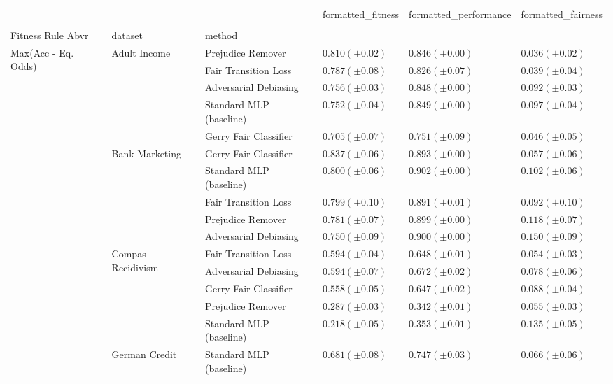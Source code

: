 \begin{tabular}{llllll}
\toprule
 &  &  & formatted_fitness & formatted_performance & formatted_fairness \\
 &  &  &  &  &  \\
Fitness Rule Abvr & dataset & method &  &  &  \\
\midrule
\multirow[t]{20}{*}{Max(Acc - Eq. Odds)} & \multirow[t]{5}{*}{Adult Income} & Prejudice Remover & $0.810 (\pm0.02)$ & $0.846 (\pm0.00)$ & $0.036 (\pm0.02)$ \\
 &  & Fair Transition Loss & $0.787 (\pm0.08)$ & $0.826 (\pm0.07)$ & $0.039 (\pm0.04)$ \\
 &  & Adversarial Debiasing & $0.756 (\pm0.03)$ & $0.848 (\pm0.00)$ & $0.092 (\pm0.03)$ \\
 &  & Standard MLP (baseline) & $0.752 (\pm0.04)$ & $0.849 (\pm0.00)$ & $0.097 (\pm0.04)$ \\
 &  & Gerry Fair Classifier & $0.705 (\pm0.07)$ & $0.751 (\pm0.09)$ & $0.046 (\pm0.05)$ \\
\cline{2-6}
 & \multirow[t]{5}{*}{Bank Marketing} & Gerry Fair Classifier & $0.837 (\pm0.06)$ & $0.893 (\pm0.00)$ & $0.057 (\pm0.06)$ \\
 &  & Standard MLP (baseline) & $0.800 (\pm0.06)$ & $0.902 (\pm0.00)$ & $0.102 (\pm0.06)$ \\
 &  & Fair Transition Loss & $0.799 (\pm0.10)$ & $0.891 (\pm0.01)$ & $0.092 (\pm0.10)$ \\
 &  & Prejudice Remover & $0.781 (\pm0.07)$ & $0.899 (\pm0.00)$ & $0.118 (\pm0.07)$ \\
 &  & Adversarial Debiasing & $0.750 (\pm0.09)$ & $0.900 (\pm0.00)$ & $0.150 (\pm0.09)$ \\
\cline{2-6}
 & \multirow[t]{5}{*}{Compas Recidivism} & Fair Transition Loss & $0.594 (\pm0.04)$ & $0.648 (\pm0.01)$ & $0.054 (\pm0.03)$ \\
 &  & Adversarial Debiasing & $0.594 (\pm0.07)$ & $0.672 (\pm0.02)$ & $0.078 (\pm0.06)$ \\
 &  & Gerry Fair Classifier & $0.558 (\pm0.05)$ & $0.647 (\pm0.02)$ & $0.088 (\pm0.04)$ \\
 &  & Prejudice Remover & $0.287 (\pm0.03)$ & $0.342 (\pm0.01)$ & $0.055 (\pm0.03)$ \\
 &  & Standard MLP (baseline) & $0.218 (\pm0.05)$ & $0.353 (\pm0.01)$ & $0.135 (\pm0.05)$ \\
\cline{2-6}
 & \multirow[t]{5}{*}{German Credit} & Standard MLP (baseline) & $0.681 (\pm0.08)$ & $0.747 (\pm0.03)$ & $0.066 (\pm0.06)$ \\

\end{tabular}
